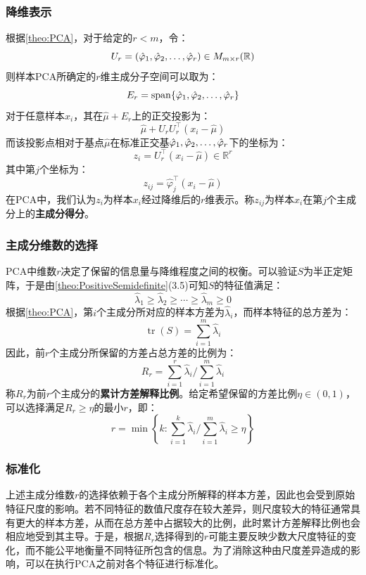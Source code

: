 \subsubsection{降维表示}
根据\cref{theo:PCA}，对于给定的$r<m$，令：
\begin{equation*}
	U_r=(\hat{\varphi}_1, \hat{\varphi}_2, \dots, \hat{\varphi}_{r})\in M_{m\times r}(\mathbb{R})
\end{equation*}
则样本PCA所确定的$r$维主成分子空间可以取为：
\begin{equation*}
	E_r=\operatorname{span}\{\hat{\varphi}_1, \hat{\varphi}_2, \dots, \hat{\varphi}_{r}\}
\end{equation*}
对于任意样本$x_i$，其在$\hat{\mu}+E_r$上的正交投影为：
\begin{equation*}
	\hat{\mu}+U_rU_r^{\top}(x_i-\hat{\mu})
\end{equation*}
而该投影点相对于基点$\hat{\mu}$在标准正交基$\hat{\varphi}_1, \hat{\varphi}_2, \dots, \hat{\varphi}_{r}$下的坐标为：
\begin{equation*}
	z_i=U_r^{\top}(x_i-\hat{\mu})\in\mathbb{R}^r
\end{equation*}
其中第$j$个坐标为：
\begin{equation*}
	z_{ij}=\hat{\varphi}_j^{\top}(x_i-\hat{\mu})
\end{equation*}
在PCA中，我们认为$z_i$为样本$x_i$经过降维后的$r$维表示。称$z_{ij}$为样本$x_i$在第$j$个主成分上的\textbf{主成分得分}。
\subsubsection{主成分维数的选择}
PCA中维数$r$决定了保留的信息量与降维程度之间的权衡。可以验证$S$为半正定矩阵，于是由\cref{theo:PositiveSemidefinite}(3.5)可知$S$的特征值满足：
\begin{equation*}
	\hat{\lambda}_1\geqslant\hat{\lambda}_2\geqslant\cdots\geqslant\hat{\lambda}_m\geqslant0
\end{equation*}
根据\cref{theo:PCA}，第$i$个主成分所对应的样本方差为$\hat{\lambda}_i$，而样本特征的总方差为：
\begin{equation*}
	\operatorname{tr}(S)=\sum_{i=1}^{m}\hat{\lambda}_i
\end{equation*}
因此，前$r$个主成分所保留的方差占总方差的比例为：
\begin{equation*}
	R_r=\sum_{i=1}^{r}\hat{\lambda}_i\Big/\sum_{i=1}^{m}\hat{\lambda}_i
\end{equation*}
称$R_r$为前$r$个主成分的\textbf{累计方差解释比例}。给定希望保留的方差比例$\eta\in(0,1)$，可以选择满足$R_r\geqslant\eta$的最小$r$，即：
\begin{equation*}
	r=\min\left\{k:\sum_{i=1}^{k}\hat{\lambda}_i\Big/\sum_{i=1}^{m}\hat{\lambda}_i\geqslant\eta\right\}
\end{equation*}
\subsubsection{标准化}
上述主成分维数$r$的选择依赖于各个主成分所解释的样本方差，因此也会受到原始特征尺度的影响。若不同特征的数值尺度存在较大差异，则尺度较大的特征通常具有更大的样本方差，从而在总方差中占据较大的比例，此时累计方差解释比例也会相应地受到其主导。于是，根据$R_r$选择得到的$r$可能主要反映少数大尺度特征的变化，而不能公平地衡量不同特征所包含的信息。为了消除这种由尺度差异造成的影响，可以在执行PCA之前对各个特征进行标准化。